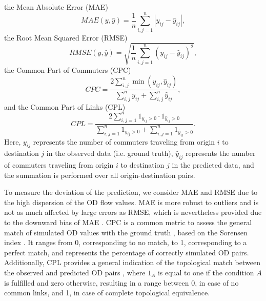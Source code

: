 the Mean Absolute Error (MAE)
\begin{equation}
\label{eq:MAE}
MAE(y,\hat{y}) = \frac{1}{n}\sum_{i,j=1}^{n}|y_{ij} - \hat{y}_{ij}|,
\end{equation}
the Root Mean Squared Error (RMSE)
\begin{equation}
\label{eq:RMSE}
RMSE(y,\hat{y}) = \sqrt{\frac{1}{n}\sum_{i,j=1}^{n}(y_{ij} - \hat{y}_{ij})^2},
\end{equation}
the Common Part of Commuters (CPC) 
\begin{equation}
\label{eq:CPC}
CPC=\frac {2\sum_{i,j}^n {\min (y_{ij},\hat{y}_{ij})} }{\sum_{i,j}^n {y_{ij}} +\sum_{i,j}^n {\hat{y}_{ij}}},
\end{equation}
and the Common Part of Links (CPL) 
\begin{equation}
\label{eq:CPL}
CPL=\frac{2\sum_{i,j=1}^{n} 1_{y_{ij} > 0}\cdot 1_{\hat{y}_{ij} > 0}}{\sum_{i,j=1}^{n}1_{y_{ij} > 0}+\sum_{i,j=1}^{n}1_{\hat{y}_{ij} > 0}} .
\end{equation}
Here, $y_{ij}$ represents the number of commuters traveling from origin $i$ to destination $j$ in the observed data (i.e. ground truth),  $\hat{y}_{ij}$ represents the number of commuters traveling from origin $i$ to destination $j$ in the predicted data, and the summation is performed over all origin-destination pairs. 

To measure the deviation of the prediction, we consider MAE and RMSE due to the high dispersion of the OD flow values. MAE is more robust to outliers and is not as much affected by large errors as RMSE, which is nevertheless provided due to the downward bias of MAE \citep{Yeghikyan2020LearningNetworks}. CPC is a common metric to assess the general match of simulated OD values with the ground truth \citep{Lenormand2012ANetworks}, based on the Sorensen index \citep{Sorensen1948AContent}. It ranges from 0, corresponding to no match, to 1, corresponding to a perfect match, and represents the percentage of correctly simulated OD pairs. Additionally, CPL provides a general indication of the topological match between the observed and predicted OD pairs \citep{Lenormand2016SystematicModels}, where $1_A$ is equal to one if the condition $A$ is fulfilled and zero otherwise, resulting in a range between 0, in case of no common links, and 1, in case of complete topological equivalence. 

